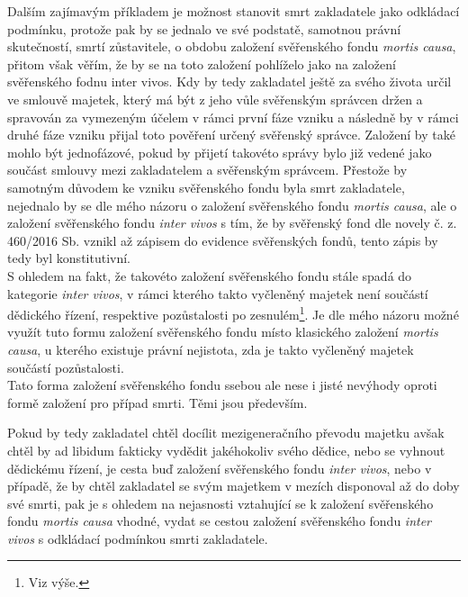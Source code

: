 \documentclass{article}
\begin{document}
Dalším zajímavým příkladem je možnost stanovit smrt zakladatele jako odkládací podmínku, protože pak by se jednalo ve své podstatě, samotnou právní skutečností, smrtí zůstavitele, o obdobu založení svěřenského fondu \textit{mortis causa}, přitom však věřím, že by se na toto založení pohlíželo jako na založení svěřenského fodnu {inter vivos}. Kdy by tedy zakladatel ještě za svého života určil ve smlouvě majetek, který má být z jeho vůle svěřenským správcen držen a spravován za vymezeným účelem v rámci první fáze vzniku a následně by v rámci druhé fáze vzniku přijal toto pověření určený svěřenský správce. Založení by také mohlo být jednofázové, pokud by přijetí takovéto správy bylo již vedené jako součást smlouvy mezi zakladatelem a svěřenským správcem. Přestože by samotným důvodem ke vzniku svěřenského fondu byla smrt zakladatele, nejednalo by se dle mého názoru o založení svěřenského fondu \textit{mortis causa}, ale o založení svěřenského fondu \textit{inter vivos} s tím, že by svěřenský fond dle novely č. z. 460/2016 Sb. vznikl až zápisem do evidence svěřenských fondů, tento zápis by tedy byl konstitutivní.\\

S ohledem na fakt, že takovéto založení svěřenského fondu stále spadá do kategorie \textit{inter vivos}, v rámci kterého takto vyčleněný majetek není součástí dědického řízení, respektive pozůstalosti po zesnulém\footnote{Viz výše.}. Je dle mého názoru možné využít tuto formu založení svěřenského fondu místo klasického založení \textit{mortis causa}, u kterého existuje právní nejistota, zda je takto vyčleněný majetek součástí pozůstalosti.\\

Tato forma založení svěřenského fondu ssebou ale nese i jisté nevýhody oproti formě založení pro případ smrti. Těmi jsou především.

Pokud by tedy zakladatel chtěl docílit mezigeneračního převodu majetku avšak chtěl by ad libidum fakticky vydědit jakéhokoliv svého dědice, nebo se vyhnout dědickému řízení, je cesta buď založení svěřenského fondu \textit{inter vivos}, nebo v případě, že by chtěl zakladatel se svým majetkem v mezích disponoval až do doby své smrti, pak je s ohledem na nejasnosti vztahující se k založení svěřenského fondu \textit{mortis causa} vhodné, vydat se cestou založení svěřenského fondu \textit{inter vivos} s odkládací podmínkou smrti zakladatele.

\end{document}
